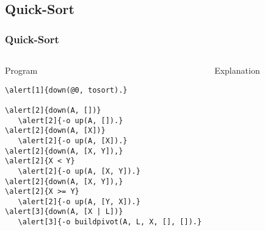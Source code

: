 
\subsection{Quick-Sort}

\begin{frame}[fragile]
  \frametitle{Quick-Sort}
  \begin{columns}[t]
       \begin{block}{Program}
         \begin{Verbatim}[fontsize=\tiny,frame=single,commandchars=\\\{\}]
\alert[1]{down(@0, tosort).}

\alert[2]{down(A, [])}
   \alert[2]{-o up(A, []).}
\alert[2]{down(A, [X])}
   \alert[2]{-o up(A, [X]).}
\alert[2]{down(A, [X, Y]),}
\alert[2]{X < Y}
   \alert[2]{-o up(A, [X, Y]).}
\alert[2]{down(A, [X, Y]),}
\alert[2]{X >= Y}
   \alert[2]{-o up(A, [Y, X]).}
\alert[3]{down(A, [X | L])}
   \alert[3]{-o buildpivot(A, L, X, [], []).}
         \end{Verbatim}
      \end{block}
      \begin{block}{Explanation}
         {\scriptsize
         \begin{itemize}
         \end{itemize}
         }
      \end{block}
   \end{columns}
\end{frame}

